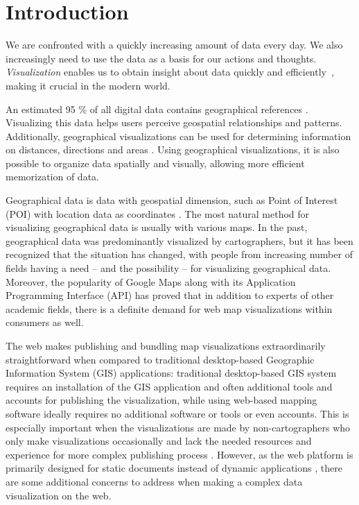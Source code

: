 
\chapter{Introduction}
\label{chapter:intro}


We are confronted with a quickly increasing amount of data every day. We also increasingly need to use the data as a basis for our actions and thoughts. \emph{Visualization} enables us to obtain insight about data quickly and efficiently~\citep{van_wijk_value_2005}, making it crucial in the modern world. 

An estimated 95 \% of all digital data contains geographical references \citep{perkins_have_2010}. Visualizing this data helps users perceive geospatial relationships and patterns. Additionally, geographical visualizations can be used for determining information on distances, directions and areas \citep[chap.~1.1]{kraak_cartography_2011}. Using geographical visualizations, it is also possible to organize data spatially and visually, allowing more efficient memorization of data.

Geographical data is data with geospatial dimension, such as Point of Interest (POI) with location data as coordinates \citep[chap.~1.2]{kraak_cartography_2011}. The most natural method for visualizing geographical data is usually with various maps. In the past, geographical data was predominantly visualized by cartographers, but it has been recognized \citep{kraak_visualization_1999} that the situation has changed, with people from increasing number of fields having a need -- and the possibility \citep[chap.~1]{slocum_thematic_2014} -- for visualizing geographical data. Moreover, the popularity of Google Maps \citep{google_maps_2005-1} along with its Application Programming Interface (API) \citep{google_maps_2005} has proved that in addition to experts of other academic fields, there is a definite demand for web map visualizations within consumers as well. 

The web makes publishing and bundling map visualizations extraordinarily straightforward when compared to traditional desktop-based Geographic Information System (GIS) applications: traditional desktop-based GIS system requires an installation of the GIS application and often additional tools and accounts for publishing the visualization, while using web-based mapping software ideally requires no additional software or tools or even accounts. This is especially important when the visualizations are made by non-cartographers who only make visualizations occasionally and lack the needed resources and experience for more complex publishing process \citep{miller_beast_2006}. However, as the web platform is primarily designed for static documents \citep{berners-lee_information_1989,berners-lee_world-wide_1992} instead of dynamic applications \citep{jazayeri_trends_2007}, there are some additional concerns to address when making a complex data visualization on the web.

